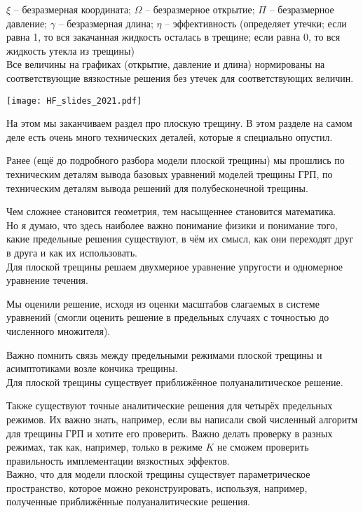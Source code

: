 \documentclass[main.tex]{subfiles}
\begin{document}
$\xi$ -- безразмерная координата;
$\Omega$ -- безразмерное открытие;
$\Pi$ -- безразмерное давление;
$\gamma$ -- безразмерная длина;
$\eta$ -- эффективность (определяет утечки; если равна 1, то вся закачанная жидкость осталась в трещине; если равна 0, то вся жидкость утекла из трещины)
\\

Все величины на графиках (открытие, давление и длина) нормированы на соответствующие вязкостные решения без утечек для соответствующих величин.

\texttt{[image: HF\_slides\_2021.pdf]}

На этом мы заканчиваем раздел про плоскую трещину.
В этом разделе на самом деле есть очень много технических деталей, которые я специально опустил.

Ранее (ещё до подробного разбора модели плоской трещины) мы прошлись по техническим деталям вывода базовых уравнений моделей трещины ГРП, по техническим деталям вывода решений для полубесконечной трещины.

Чем сложнее становится геометрия, тем насыщеннее становится математика.
\\

Но я думаю, что здесь наиболее важно понимание физики и понимание того, какие предельные решения существуют, в чём их смысл, как они переходят друг в друга и как их использовать.
\\

Для плоской трещины решаем двухмерное уравнение упругости и одномерное уравнение течения.

Мы оценили решение, исходя из оценки масштабов слагаемых в системе уравнений (смогли оценить решение в предельных случаях с точностью до численного множителя).

Важно помнить связь между предельными режимами плоской трещины и асимптотиками возле кончика трещины.
\\

Для плоской трещины существует приближённое полуаналитическое решение.

Также существуют точные аналитические решения для четырёх предельных режимов.
Их важно знать, например, если вы написали свой численный алгоритм для трещины ГРП и хотите его проверить.
Важно делать проверку в разных режимах, так как, например, только в режиме $K$ не сможем проверить правильность имплементации вязкостных эффектов.
\\

Важно, что для модели плоской трещины существует параметрическое пространство, которое можно реконструировать, используя, например, полученные приближённые полуаналитические решения.
\end{document}
